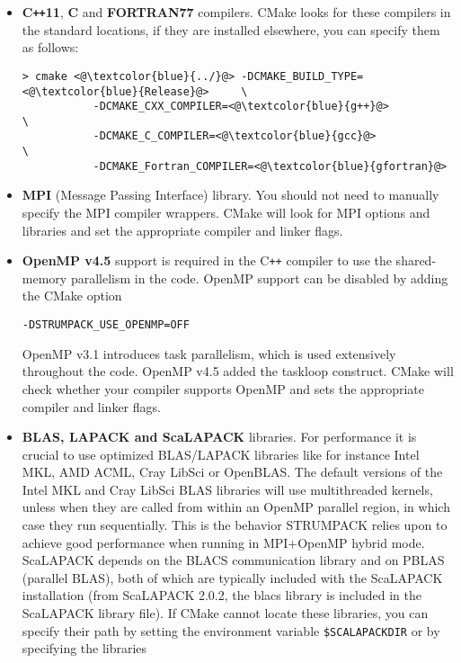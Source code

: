 \documentclass{article}
\newcommand{\tm}{\textsuperscript{\textregistered}}
\begin{document}
\begin{itemize}
\item \textbf{C\texttt{++}11}, \textbf{C} and \textbf{FORTRAN77}
  compilers. CMake looks for these compilers in the standard
  locations, if they are installed elsewhere, you can specify them as
  follows:
  \begin{lstlisting}[style=Bash]
    > cmake <@\textcolor{blue}{../}@> -DCMAKE_BUILD_TYPE=<@\textcolor{blue}{Release}@>     \
           -DCMAKE_CXX_COMPILER=<@\textcolor{blue}{g++}@>            \
           -DCMAKE_C_COMPILER=<@\textcolor{blue}{gcc}@>              \
           -DCMAKE_Fortran_COMPILER=<@\textcolor{blue}{gfortran}@>
  \end{lstlisting}
\item \textbf{MPI} (Message Passing Interface) library.  You should
  not need to manually specify the MPI compiler wrappers.  CMake will
  look for MPI options and libraries and set the appropriate compiler
  and linker flags.
\item \textbf{OpenMP v4.5} support is required in the C\texttt{++}
  compiler to use the shared-memory parallelism in the code. OpenMP
  support can be disabled by adding the CMake option
  \begin{lstlisting}[style=Bash]
    -DSTRUMPACK_USE_OPENMP=OFF
  \end{lstlisting}
  OpenMP v3.1 introduces task parallelism, which is used extensively
  throughout the code. OpenMP v4.5 added the taskloop construct. CMake
  will check whether your compiler supports OpenMP and sets the
  appropriate compiler and linker flags.
\item \textbf{BLAS, LAPACK and ScaLAPACK} libraries. For performance
  it is crucial to use optimized BLAS/LAPACK libraries like for
  instance Intel\tm{} MKL, AMD\tm{} ACML, Cray\tm{} LibSci or
  OpenBLAS. The default versions of the Intel\tm{} MKL and Cray\tm{}
  LibSci BLAS libraries will use multithreaded kernels, unless when
  they are called from within an OpenMP parallel region, in which case
  they run sequentially. This is the behavior STRUMPACK relies upon to
  achieve good performance when running in MPI+OpenMP hybrid
  mode. ScaLAPACK depends on the BLACS communication library and on
  PBLAS (parallel BLAS), both of which are typically included with the
  ScaLAPACK installation (from ScaLAPACK 2.0.2, the blacs library is
  included in the ScaLAPACK library file). If CMake cannot locate
  these libraries, you can specify their path by setting the
  environment variable
  \lstinline[style=Bash]!$SCALAPACKDIR! or by specifying the libraries

\end{itemize}
\end{document}

